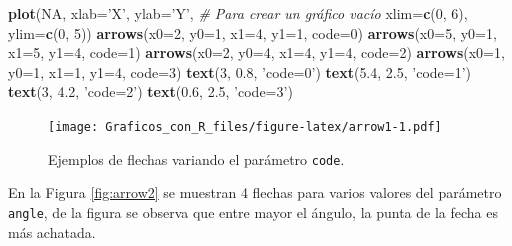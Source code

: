 \documentclass[10pt,]{krantz}
\makeatletter
\newenvironment{Shaded}{\begin{snugshade}}{\end{snugshade}}
\newcommand{\KeywordTok}[1]{\textcolor[rgb]{0.13,0.29,0.53}{\textbf{{#1}}}}
\newcommand{\DataTypeTok}[1]{\textcolor[rgb]{0.13,0.29,0.53}{{#1}}}
\newcommand{\DecValTok}[1]{\textcolor[rgb]{0.00,0.00,0.81}{{#1}}}
\newcommand{\FloatTok}[1]{\textcolor[rgb]{0.00,0.00,0.81}{{#1}}}
\newcommand{\StringTok}[1]{\textcolor[rgb]{0.31,0.60,0.02}{{#1}}}
\newcommand{\CommentTok}[1]{\textcolor[rgb]{0.56,0.35,0.01}{\textit{{#1}}}}
\newcommand{\OtherTok}[1]{\textcolor[rgb]{0.56,0.35,0.01}{{#1}}}
\newcommand{\NormalTok}[1]{{#1}}
\newenvironment{kframe}{%
\medskip{}
\setlength{\fboxsep}{.8em}
 \def\at@end@of@kframe{}%
 \ifinner\ifhmode%
  \def\at@end@of@kframe{\end{minipage}}%
  \begin{minipage}{\columnwidth}%
 \fi\fi%
 \def\FrameCommand##1{\hskip\@totalleftmargin \hskip-\fboxsep
 \colorbox{shadecolor}{##1}\hskip-\fboxsep
     \hskip-\linewidth \hskip-\@totalleftmargin \hskip\columnwidth}%
 \MakeFramed {\advance\hsize-\width
   \@totalleftmargin\z@ \linewidth\hsize
   \@setminipage}}%
 {\par\unskip\endMakeFramed%
 \at@end@of@kframe}
\renewenvironment{Shaded}{\begin{kframe}}{\end{kframe}}
\makeatother
\begin{document}
\begin{Shaded}
\begin{Highlighting}[]
\KeywordTok{plot}\NormalTok{(}\OtherTok{NA}\NormalTok{, }\DataTypeTok{xlab=}\StringTok{'X'}\NormalTok{, }\DataTypeTok{ylab=}\StringTok{'Y'}\NormalTok{,      }\CommentTok{# Para crear un gráfico vacío}
     \DataTypeTok{xlim=}\KeywordTok{c}\NormalTok{(}\DecValTok{0}\NormalTok{, }\DecValTok{6}\NormalTok{), }\DataTypeTok{ylim=}\KeywordTok{c}\NormalTok{(}\DecValTok{0}\NormalTok{, }\DecValTok{5}\NormalTok{))}
\KeywordTok{arrows}\NormalTok{(}\DataTypeTok{x0=}\DecValTok{2}\NormalTok{, }\DataTypeTok{y0=}\DecValTok{1}\NormalTok{, }\DataTypeTok{x1=}\DecValTok{4}\NormalTok{, }\DataTypeTok{y1=}\DecValTok{1}\NormalTok{, }\DataTypeTok{code=}\DecValTok{0}\NormalTok{)}
\KeywordTok{arrows}\NormalTok{(}\DataTypeTok{x0=}\DecValTok{5}\NormalTok{, }\DataTypeTok{y0=}\DecValTok{1}\NormalTok{, }\DataTypeTok{x1=}\DecValTok{5}\NormalTok{, }\DataTypeTok{y1=}\DecValTok{4}\NormalTok{, }\DataTypeTok{code=}\DecValTok{1}\NormalTok{)}
\KeywordTok{arrows}\NormalTok{(}\DataTypeTok{x0=}\DecValTok{2}\NormalTok{, }\DataTypeTok{y0=}\DecValTok{4}\NormalTok{, }\DataTypeTok{x1=}\DecValTok{4}\NormalTok{, }\DataTypeTok{y1=}\DecValTok{4}\NormalTok{, }\DataTypeTok{code=}\DecValTok{2}\NormalTok{)}
\KeywordTok{arrows}\NormalTok{(}\DataTypeTok{x0=}\DecValTok{1}\NormalTok{, }\DataTypeTok{y0=}\DecValTok{1}\NormalTok{, }\DataTypeTok{x1=}\DecValTok{1}\NormalTok{, }\DataTypeTok{y1=}\DecValTok{4}\NormalTok{, }\DataTypeTok{code=}\DecValTok{3}\NormalTok{)}
\KeywordTok{text}\NormalTok{(}\DecValTok{3}\NormalTok{, }\FloatTok{0.8}\NormalTok{, }\StringTok{'code=0'}\NormalTok{)}
\KeywordTok{text}\NormalTok{(}\FloatTok{5.4}\NormalTok{, }\FloatTok{2.5}\NormalTok{, }\StringTok{'code=1'}\NormalTok{)}
\KeywordTok{text}\NormalTok{(}\DecValTok{3}\NormalTok{, }\FloatTok{4.2}\NormalTok{, }\StringTok{'code=2'}\NormalTok{)}
\KeywordTok{text}\NormalTok{(}\FloatTok{0.6}\NormalTok{, }\FloatTok{2.5}\NormalTok{, }\StringTok{'code=3'}\NormalTok{)}
\end{Highlighting}
\end{Shaded}

\begin{figure}[htbp]
\centering
\texttt{[image: Graficos\_con\_R\_files/figure-latex/arrow1-1.pdf]}
\caption{\label{fig:arrow1}Ejemplos de flechas variando el parámetro
\texttt{code}.}
\end{figure}

En la Figura \ref{fig:arrow2} se muestran 4 flechas para varios valores
del parámetro \texttt{angle}, de la figura se observa que entre mayor el
ángulo, la punta de la fecha es más achatada.
\end{document}
